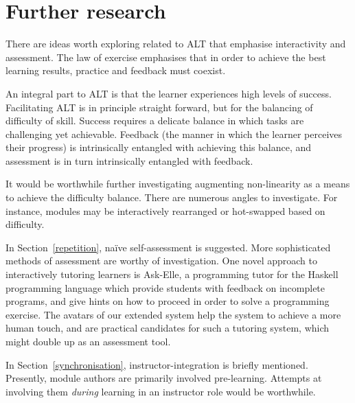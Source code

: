 \section{Further research}
\label{further}
There are ideas worth exploring related to ALT that emphasise interactivity 
and assessment. The law of exercise emphasises that in order to achieve the 
best learning results, practice and feedback must 
coexist\cite{murphy2011games}.

An integral part to ALT is that the learner experiences high levels of 
success\cite{cotton1990educational, murphy2011games}. Facilitating ALT is in 
principle straight forward, but for the balancing of difficulty of skill. 
Success requires a delicate balance in which tasks are challenging yet 
achievable. Feedback (the manner in which the learner perceives their 
progress) is intrinsically entangled with achieving this balance, and 
assessment is in turn intrinsically entangled with 
feedback\cite{murphy2011games}.

It would be worthwhile further investigating augmenting non-linearity as a 
means to achieve the difficulty balance. There are numerous angles to 
investigate. For instance, modules may be interactively rearranged or 
hot-swapped based on difficulty.

In Section~\ref{repetition}, naïve self-assessment is suggested. More 
sophisticated methods of assessment are worthy of investigation. One novel 
approach to interactively tutoring learners is Ask-Elle, a programming tutor 
for the Haskell programming language which provide students with feedback on 
incomplete programs, and give hints on how to proceed in order to solve a 
programming exercise\cite{jeuring2012ask}. The avatars of our extended system 
help the system to achieve a more human touch\cite{berntsen2015enabling}, and 
are practical candidates for such a tutoring system, which might double up as 
an assessment tool.

In Section~\ref{synchronisation}, instructor-integration is briefly mentioned. 
Presently, module authors are primarily involved pre-learning. Attempts at 
involving them \emph{during} learning in an instructor role would be 
worthwhile.
